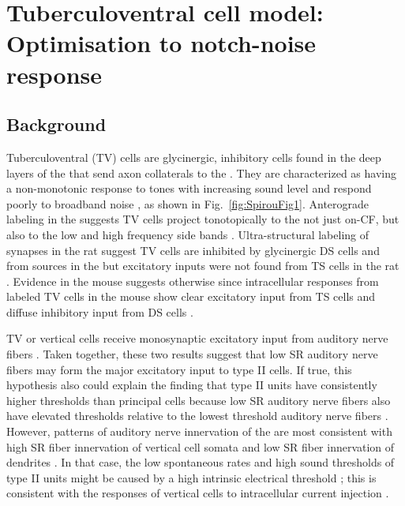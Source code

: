 \graphicspath{{./gfx/}{../figures/}{/media/data/Work/cnstellate/}{/media/data/Work/cnstellate/TV_Notch/}{/media/data/Work/Responses/}{/media/data/Work/thesis/ans2010/gfx/}}

\section[TV Cell Model]{Tuberculoventral cell model: Optimisation to notch-noise response}
\label{sec:TV-cell-model}

\subsection{Background}

Tuberculoventral (TV) cells are glycinergic, inhibitory cells found in the deep
layers of the \DCN that send axon collaterals to the \VCN\@. They are
characterized as having a non-monotonic response to tones with increasing sound
level and respond poorly to broadband noise
\citep{SpirouDavisEtAl:1999,NelkenYoung:1997,ReissYoung:2005}, as shown in
Fig.~\ref{fig:SpirouFig1}.  Anterograde labeling in the \DCN suggests TV cells
project tonotopically to the \VCN not just on-CF, but also to the low and high
frequency side bands
\citep{MunirathinamOstapoffEtAl:2004,OstapoffMorestEtAl:1999}.  Ultra-structural
labeling of synapses in the rat \DCN suggest TV cells are inhibited by
glycinergic DS cells and from sources in the \DCN but excitatory inputs were not
found from TS cells in the rat \citep{Rubio:2005}. Evidence in the mouse
suggests otherwise since intracellular responses from labeled TV cells in the
mouse show clear excitatory input from TS cells and diffuse inhibitory input
from DS cells \citep{ZhangOertel:1993b,WickesbergOertel:1993}.


TV or vertical cells receive monosynaptic excitatory input from auditory nerve
ﬁbers \citep{OertelWu:1989,ZhangOertel:1993b}. Taken together, these two
results suggest that low SR auditory nerve ﬁbers may form the major excitatory
input to type II cells. If true, this hypothesis also could explain the ﬁnding
that type II units have consistently higher thresholds than \DCN principal cells
\citep{YoungBrownell:1976} because low SR auditory nerve ﬁbers also have
elevated thresholds relative to the lowest threshold auditory nerve ﬁbers
\citep{Liberman:1978}. However, patterns of auditory nerve innervation of the
\DCN are most consistent with high SR ﬁber innervation of vertical cell somata
and low SR ﬁber innervation of dendrites \citep{Liberman:1993}. In that case,
the low spontaneous rates and high sound thresholds of type II units might be
caused by a high intrinsic electrical threshold \citep{HancockDavisEtAl:1997};
this is consistent with the responses of vertical cells to intracellular current
injection \citep{DingVoigt:1997,ZhangOertel:1993b}.


